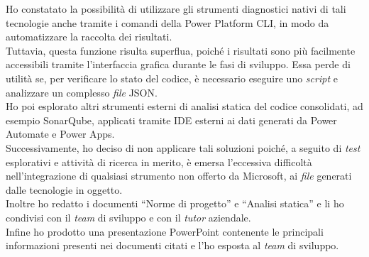 \noindent Ho constatato la possibilità di utilizzare gli strumenti diagnostici nativi di tali tecnologie anche tramite i comandi della Power Platform CLI, in modo da automatizzare la raccolta dei risultati.\\ 
Tuttavia, questa funzione risulta superflua, poiché i risultati sono più facilmente accessibili tramite l'interfaccia grafica durante le fasi di sviluppo.
Essa perde di utilità se, per verificare lo stato del codice, è necessario eseguire uno \emph{script} e analizzare un complesso \emph{file} JSON.\\ 
Ho poi esplorato altri strumenti esterni di analisi statica del codice consolidati, ad esempio SonarQube, applicati tramite IDE esterni ai dati generati da Power Automate e Power Apps.\\
Successivamente, ho deciso di non applicare tali soluzioni poiché, a seguito di \emph{test} esplorativi e attività di ricerca in merito, è emersa l'eccessiva difficoltà nell'integrazione di qualsiasi strumento non offerto da Microsoft, ai \emph{file} generati dalle tecnologie in oggetto.\\ 
Inoltre ho redatto i documenti “Norme di progetto” e “Analisi statica” e li ho condivisi con il \emph{team} di sviluppo e con il \emph{\emph{tutor}} aziendale.\\  
Infine ho prodotto una presentazione PowerPoint contenente le principali informazioni presenti nei documenti citati e l'ho esposta al \emph{team} di sviluppo.\\


